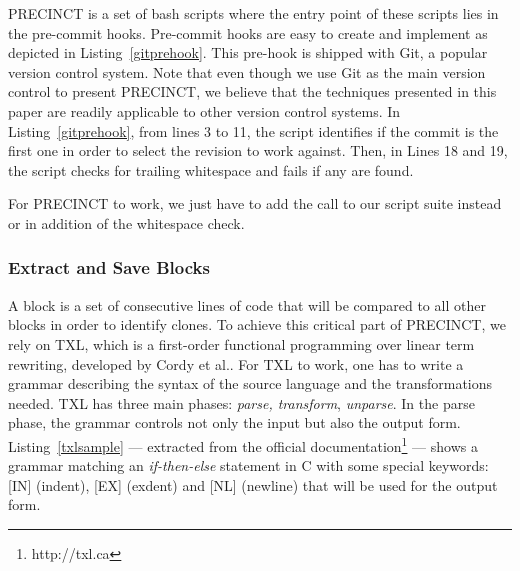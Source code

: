 PRECINCT is a set of bash scripts where the entry point of these scripts lies in the pre-commit hooks. Pre-commit hooks are easy to create and implement as depicted in Listing~\ref{gitprehook}.
This pre-hook is shipped with Git, a popular version control system.
Note that even though we use Git as the main version control to present PRECINCT, we believe that the techniques presented in this paper are readily applicable to other version control systems.
In Listing~\ref{gitprehook}, from lines 3 to 11, the script identifies if the commit is the first one in order to select the revision to work against.
Then, in Lines 18 and 19, the script checks for trailing whitespace and fails if any are found.

For PRECINCT to work, we just have to add the call to our script suite instead or in addition of the whitespace check.

\noindent\begin{minipage}{0.90\linewidth}

  

\end{minipage}


\subsubsection{Extract and Save Blocks}
\label{sub:Extract and Save Blocks}

A block is a set of consecutive lines of code that will be compared to all other blocks in order to identify clones.
To achieve this critical part of PRECINCT, we rely on TXL\cite{Cordy2006a}, which is a first-order functional programming over linear term rewriting, developed by Cordy et al.\cite{Cordy2006a}.
For TXL to work, one has to write a grammar describing the syntax of the source  language and the transformations needed. TXL has three main phases: \textit{parse, transform}, \textit{unparse}.
In the parse phase, the grammar controls not only the input but also the output form.
Listing~\ref{txlsample} --- extracted from the official documentation\footnote{http://txl.ca} --- shows a grammar matching an \textit{if-then-else} statement in C with some special keywords: [IN] (indent), [EX] (exdent) and [NL] (newline) that will be used for the output form.

\noindent\begin{minipage}{0.90\linewidth}

  

\end{minipage}

